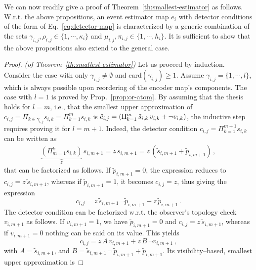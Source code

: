 We can now readily give a proof of Theorem~\ref{th:smallest-estimator} as follows. W.r.t. the above propositions, an event estimator map $e_i$ with detector conditions of the form of Eq.~\ref{eq:detector-map} is characterized by a generic combination of the sets $\gamma_{i,j}, \rho_{i,j} \in \{1, \cdots, \kappa_i\}$ and $\mu_{i,j}, \pi_{i,j} \in \{1, \cdots, h_i\}$. It is sufficient to show that the above propositions also extend to the general case. 
\begin{proof}{\em (of Theorem~\ref{th:smallest-estimator})}
Let us proceed by induction. Consider the case with only $\gamma_{i,j} \neq \emptyset$ and $\textrm{card}(\gamma_{i,j}) \geq 1$. Assume $\gamma_{i,j}=\{1, \cdots, l\}$, which is always possible upon reordering of the encoder map's components. The case with $l=1$ is proved by Prop.~\ref{prop:or-atom}. By assuming that the thesis holds for $l=m$, i.e., that the smallest upper approximation of $c_{i,j} = \Pi_{k \in \gamma_{i,j}} s_{i,k} = \Pi_{k=1}^{m} s_{i,k}$ is $\tilde{c}_{i,j} = \left( \Pi_{k=1}^{m} \, \tilde{s}_{i,k} \, v_{i,k} + \neg v_{i,k} \right)$, the inductive step requires proving it for $l=m+1$. Indeed, the detector condition $c_{i,j}=\Pi_{k=1}^{m+1} s_{i,k}$ can be written as 
\begin{equation*}
\begin{array}{rcl}
\underbrace{\left( \Pi_{m=1}^k s_{i,k} \right)}_{z} \, s_{i,m+1} = z \, s_{i,m+1} = z \, \left(\tilde{s}_{i,m+1} + \tilde{p}_{i,m+1} \right) \, ,
\end{array}
\end{equation*}
that can be factorized as follows. If $\tilde{p}_{i,m+1} = 0$, the expression reduces to $c_{i,j} = z \, \tilde{s}_{i,m+1}$, whereas if $\tilde{p}_{i,m+1} = 1$, it becomes $c_{i,j} = z$, thus giving the expression
\begin{equation*}
c_{i,j} =  z \, \tilde{s}_{i,m+1} \, \neg \tilde{p}_{i,m+1} + z \, \tilde{p}_{i,m+1} \, .
\end{equation*}
The detector condition can be factorized w.r.t. the observer's topology check $v_{i,m+1}$ as follows. If $v_{i,m+1} = 1$, we have $\tilde{p}_{i,m+1} = 0$ and $c_{i,j} = z \, \tilde{s}_{i,m+1}$, whereas if $v_{i,m+1} = 0$ nothing can be said on its value. This yields
\begin{equation*}
c_{i,j} = z \, A \, v_{i,m+1} + z \, B \, \neg v_{i,m+1} \, ,
\end{equation*}
with $A =  \tilde{s}_{i,m+1}$, and $B = \tilde{s}_{i,m+1} \, \neg \, \tilde{p}_{i,m+1} + \tilde{p}_{i,m+1}$. Its visibility--based, smallest upper approximation is

\end{proof}
